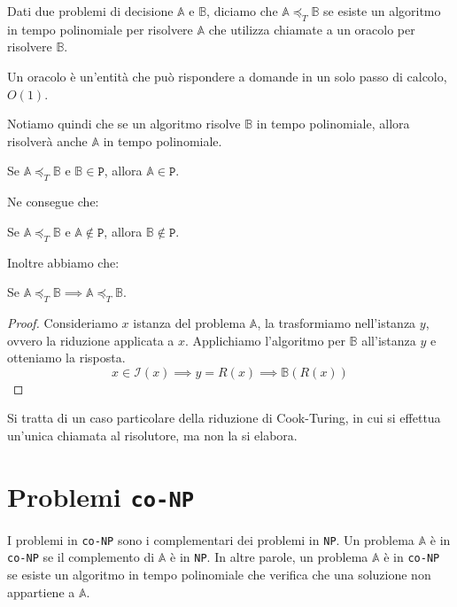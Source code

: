 \begin{tcolorbox}[title =$\mathbb{A} \preceq_T \mathbb{B}$]
    Dati due problemi di decisione $\mathbb{A}$ e $\mathbb{B}$, diciamo che $\mathbb{A} \preceq_T \mathbb{B}$
    se esiste un algoritmo in tempo polinomiale per risolvere $\mathbb{A}$ che utilizza chiamate a un
    oracolo per risolvere $\mathbb{B}$.
\end{tcolorbox}
\begin{tcolorbox}[title = Oracolo]
    Un oracolo è un'entità che può rispondere a domande in un solo passo di calcolo, $O(1)$.
\end{tcolorbox}
Notiamo quindi che se un algoritmo risolve $\mathbb{B}$ in tempo polinomiale, allora risolverà
anche $\mathbb{A}$ in tempo polinomiale. 
\begin{theorem}
    Se $\mathbb{A} \preceq_T \mathbb{B}$ e $\mathbb{B} \in \texttt{P}$, allora $\mathbb{A} \in \texttt{P}$.
\end{theorem}
Ne consegue che:
\begin{theorem}
    Se $\mathbb{A} \preceq_T \mathbb{B}$ e $\mathbb{A} \not \in \texttt{P}$, allora $\mathbb{B} \not \in \texttt{P}$.
\end{theorem}

Inoltre abbiamo che:
\begin{theorem}
    Se $\mathbb{A} \preceq_T \mathbb{B} \implies \mathbb{A} \preceq_T \mathbb{B}$.
\end{theorem}
\begin{proof}
    Consideriamo $x$ istanza del problema $\mathbb{A}$, la trasformiamo nell'istanza $y$, ovvero la riduzione applicata 
    a $x$. Applichiamo l'algoritmo per $\mathbb{B}$ all'istanza $y$ e otteniamo la risposta.
    \[
        x \in \mathcal{I}(x) \implies y = R(x) \implies \mathbb{B}(R(x))
    \]
\end{proof}
Si tratta di un caso particolare della riduzione di Cook-Turing, in cui si effettua un'unica chiamata al risolutore,
ma non la si elabora.

\section{Problemi \texttt{co-NP}}
I problemi in \texttt{co-NP} sono i complementari dei problemi in \texttt{NP}. Un problema
$\mathbb{A}$ è in \texttt{co-NP} se il complemento di $\mathbb{A}$ è in \texttt{NP}. In altre
parole, un problema $\mathbb{A}$ è in \texttt{co-NP} se esiste un algoritmo in tempo polinomiale
che verifica che una soluzione non appartiene a $\mathbb{A}$.

